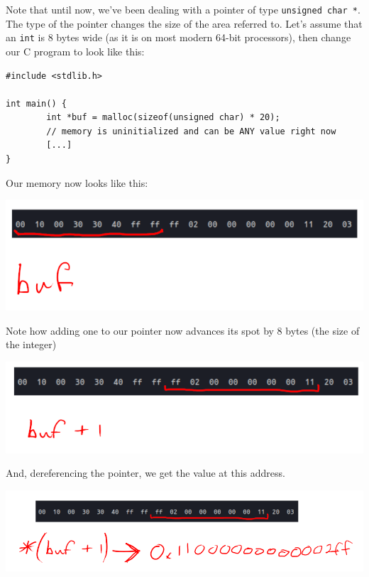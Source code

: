 \documentclass[11pt]{article}
\begin{document}
Note that until now, we've been dealing with a pointer of type
\texttt{unsigned char *}. The type of the pointer changes the size of the
area referred to. Let's assume that an \texttt{int} is 8 bytes wide (as
it is on most modern 64-bit processors), then change our C program
to look like this:

\begin{verbatim}
#include <stdlib.h>

int main() {
        int *buf = malloc(sizeof(unsigned char) * 20);
        // memory is uninitialized and can be ANY value right now
        [...]
}
\end{verbatim}
Our memory now looks like this:

\begin{center}
\includegraphics[width=.9\linewidth]{./imgs/newbuf.png}
\end{center}

Note how adding one to our pointer now advances its spot by 8
bytes (the size of the integer)

\begin{center}
\includegraphics[width=.9\linewidth]{./imgs/newbufplus.png}
\end{center}

And, dereferencing the pointer, we get the value at this address.

\begin{center}
\includegraphics[width=.9\linewidth]{./imgs/newbufderef.png}
\end{center}
\end{document}
